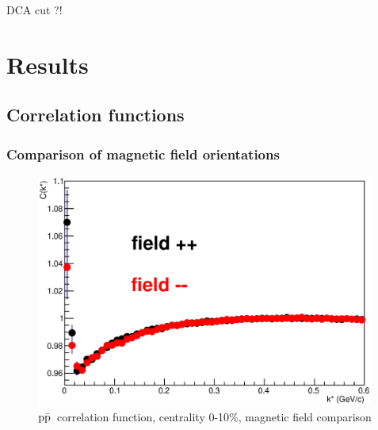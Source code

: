 \documentclass[ALICE,manyauthors]{ALICE_analysis_notes}
\newcommand{\pap}{$\rm p\bar{\rm p}$}
\newcommand{\pal}{$\rm p\bar{\rm \Lambda}$}
\newcommand{\apl}{$\bar{\rm p }\Lambda$}
\begin{document}



DCA cut ?!

\section{Results}

\subsection{Correlation functions}

\subsubsection{Comparison of magnetic field orientations}

\begin{figure}[]
   \centering
   \includegraphics[width=0.99\textwidth]{pics/compPAP}
   \caption{ \pap~correlation function, centrality 0-10$\%$, magnetic field comparison}
   \label{fig:papCorrFun}
 \end{figure}
\end{document}
